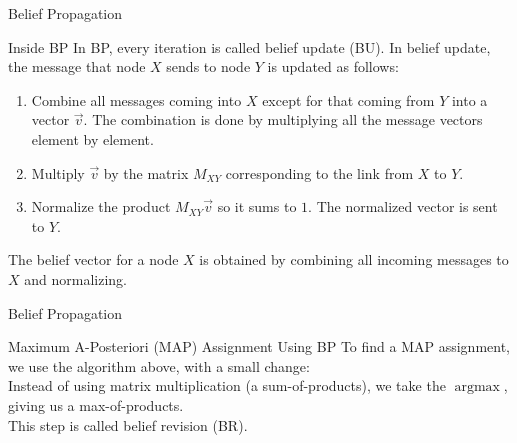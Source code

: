 \documentclass{beamer}
\begin{document}
\begin{frame}{Belief Propagation}
    \begin{block}{Inside BP}
        In BP, every iteration is called \alert{belief update (BU)}. In belief update, the message
        that node $ X $ sends to node $ Y $ is updated as follows:
        \begin{enumerate}
            \item Combine all messages coming into $ X $ except for that coming from $ Y $ into a vector $ \vec{v} $. The combination is done by multiplying all the message vectors element by element.
            \item Multiply $ \vec{v} $ by the matrix $ M_{XY} $ corresponding to the link from $ X $ to $ Y $.
            \item Normalize the product $ M_{XY}\vec{v} $ so it sums to $ 1 $. The normalized vector is sent to $ Y $.
        \end{enumerate}
        The belief vector for a node $ X $ is obtained by combining all incoming messages to $ X $ and normalizing.
    \end{block}
\end{frame}
\begin{frame}{Belief Propagation}
    \begin{block}{Maximum A-Posteriori (MAP) Assignment Using BP}
        To find a MAP assignment, we use the algorithm above, with a small change:\\
        Instead of using matrix multiplication (a sum-of-products), we take the $ \operatorname{argmax} $, giving us a max-of-products.\\
        This step is called \alert{belief revision (BR)}.
    \end{block}
\end{frame}

\end{document}
